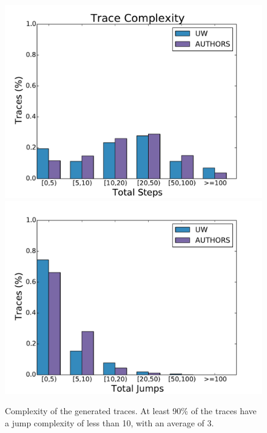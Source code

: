 \begin{figure}[t]
\centering
\includegraphics[width=\linewidth]{trace_size_step.pdf}
\includegraphics[width=\linewidth]{trace_size_jump.pdf}
\caption{Complexity of the generated traces. At least 90\% of the traces
  have a jump complexity of less than 10, with an average of 3.}
\label{fig:results-complexity}
\end{figure}
%

